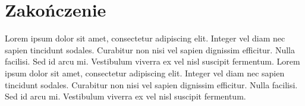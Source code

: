 \chapter*{Zakończenie}

Lorem ipsum dolor sit amet, consectetur adipiscing elit. Integer vel diam nec sapien tincidunt sodales. Curabitur non nisi vel sapien dignissim efficitur. Nulla facilisi. Sed id arcu mi. Vestibulum viverra ex vel nisl suscipit fermentum. Lorem ipsum dolor sit amet, consectetur adipiscing elit. Integer vel diam nec sapien tincidunt sodales. Curabitur non nisi vel sapien dignissim efficitur. Nulla facilisi. Sed id arcu mi. Vestibulum viverra ex vel nisl suscipit fermentum.

